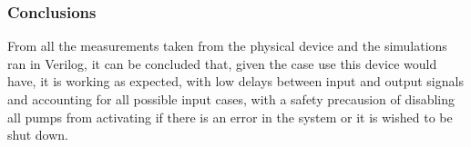 \newpage
\subsubsection{\color{orange}Conclusions}
From all the measurements taken from the physical device and the simulations ran in Verilog, it can be concluded
that, given the case use this device would have, it is working as expected, with low delays between input and
output signals and accounting for all possible input cases, with a safety precausion of disabling all pumps from
activating if there is an error in the system or it is wished to be shut down.